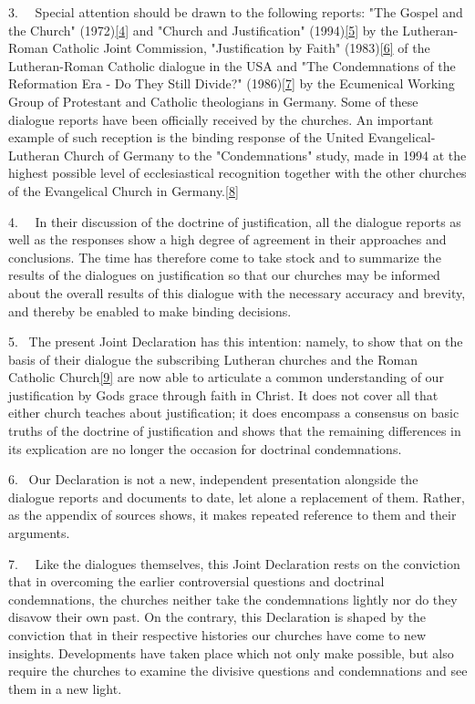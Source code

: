 3.~ ~Special attention should be drawn to the following reports: "The
Gospel and the Church"
(1972)\label{r4}{}\hyperref[4]{{[}4{]}} and "Church and
Justification" (1994)\label{r5}{}\hyperref[5]{{[}5{]}} by
the Lutheran-Roman Catholic Joint Commission, "Justification by Faith"
(1983)\label{r6}{}\hyperref[6]{{[}6{]}} of the
Lutheran-Roman Catholic dialogue in the USA and "The Condemnations of
the Reformation Era - Do They Still Divide?"
(1986)\label{r7}{}\hyperref[7]{{[}7{]}} by the Ecumenical
Working Group of Protestant and Catholic theologians in Germany. Some of
these dialogue reports have been officially received by the churches. An
important example of such reception is the binding response of the
United Evangelical-Lutheran Church of Germany to the "Condemnations"
study, made in 1994 at the highest possible level of ecclesiastical
recognition together with the other churches of the Evangelical Church
in Germany.\label{r8}{}\hyperref[8]{{[}8{]}}

4.~ ~In their discussion of the doctrine of justification, all the
dialogue reports as well as the responses show a high degree of
agreement in their approaches and conclusions. The time has therefore
come to take stock and to summarize the results of the dialogues on
justification so that our churches may be informed about the overall
results of this dialogue with the necessary accuracy and brevity, and
thereby be enabled to make binding decisions.

5.~ The present Joint Declaration has this intention: namely, to show
that on the basis of their dialogue the subscribing Lutheran churches
and the Roman Catholic
Church\label{r9}{}\hyperref[9]{{[}9{]}} are now able to
articulate a common understanding of our justification by
God\textquotesingle s grace through faith in Christ. It does not cover
all that either church teaches about justification; it does encompass a
consensus on basic truths of the doctrine of justification and shows
that the remaining differences in its explication are no longer the
occasion for doctrinal condemnations.

6.~ Our Declaration is not a new, independent presentation alongside the
dialogue reports and documents to date, let alone a replacement of them.
Rather, as the appendix of sources shows, it makes repeated reference to
them and their arguments.

7.~ ~Like the dialogues themselves, this Joint Declaration rests on the
conviction that in overcoming the earlier controversial questions and
doctrinal condemnations, the churches neither take the condemnations
lightly nor do they disavow their own past. On the contrary, this
Declaration is shaped by the conviction that in their respective
histories our churches have come to new insights. Developments have
taken place which not only make possible, but also require the churches
to examine the divisive questions and condemnations and see them in a
new light.

